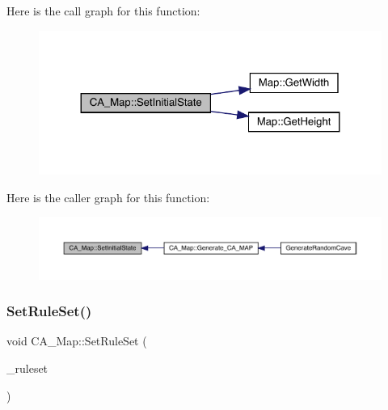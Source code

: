 Here is the call graph for this function\+:
\nopagebreak
\begin{figure}[H]
\begin{center}
\leavevmode
\includegraphics[width=324pt]{df/dfe/class_c_a___map_ad4c6a5b3ca7121d6c4593061d4bf3056_cgraph}
\end{center}
\end{figure}
Here is the caller graph for this function\+:
\nopagebreak
\begin{figure}[H]
\begin{center}
\leavevmode
\includegraphics[width=350pt]{df/dfe/class_c_a___map_ad4c6a5b3ca7121d6c4593061d4bf3056_icgraph}
\end{center}
\end{figure}
\mbox{\label{class_c_a___map_a5d22c84ef623d63d99300d1f83af143e}} 
\subsubsection{\texorpdfstring{Set\+Rule\+Set()}{SetRuleSet()}}
{\footnotesize\ttfamily void C\+A\+\_\+\+Map\+::\+Set\+Rule\+Set (\begin{DoxyParamCaption}\item[{\mbox{\hyperlink{_c_a_map_8hpp_a8502e9e74cc08ed2c245d58ff7cd4a88}{C\+A\+\_\+\+Rule\+Set}}}]{\+\_\+ruleset }\end{DoxyParamCaption})}

